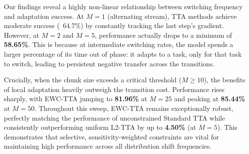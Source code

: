 \documentclass{article}
\theoremstyle{plain}
\theoremstyle{definition}
\theoremstyle{remark}
\begin{document}
\begin{table}[h]
\caption{Overall classification accuracy (\%) of test-time model merging across task switching frequencies (chunk size $M$, where smaller $M$ indicates higher switching frequency) under $\eta_\lambda = 0.5$, $\gamma = 100.0$.}
\label{switching-frequency-table}
\vskip 0.05in
\begin{center}
\begin{small}
\begin{sc}
\end{sc}
\end{small}
\end{center}
\vskip -0.15in
\end{table}

Our findings reveal a highly non-linear relationship between switching frequency and adaptation success. At $M=1$ (alternating stream), TTA methods achieve moderate success (~64.7\%) by constantly tracking the last step's gradient. However, at $M=2$ and $M=5$, performance actually drops to a minimum of \textbf{58.65\%}. This is because at intermediate switching rates, the model spends a larger percentage of its time out of phase: it adapts to a task, only for that task to switch, leading to persistent negative transfer across the transitions. 

Crucially, when the chunk size exceeds a critical threshold ($M \ge 10$), the benefits of local adaptation heavily outweigh the transition cost. Performance rises sharply, with EWC-TTA jumping to \textbf{81.96\%} at $M=25$ and peaking at \textbf{85.44\%} at $M=50$. Throughout this sweep, EWC-TTA remains exceptionally robust, perfectly matching the performance of unconstrained Standard TTA while consistently outperforming uniform L2-TTA by up to \textbf{4.50\%} (at $M=5$). This demonstrates that selective, sensitivity-weighted constraints are vital for maintaining high performance across all distribution shift frequencies.
\end{document}
